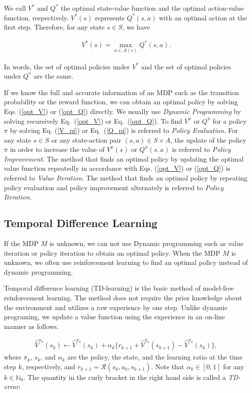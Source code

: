 We call $V^{\ast}$ and $Q^{\ast}$ the optimal state-value function and the optimal action-value function, respectively. $V^{\ast}(s)$ represents $Q^{\ast}(s,a)$ with an optimal action at the first step. Therefore, for any state $s \in S$, we have

\begin{align*}
  V^{\ast}(s) = \max_{a \in \mathcal{A}(s)} Q^{\ast}(s,a).
\end{align*}

In words, the set of optimal policies under $V^{\ast}$ and the set of optimal policies under $Q^{\ast}$ are the same.

If we know the full and accurate information of an MDP such as the transition probability or the reward function, we can obtain an optimal policy by solving Eqs. (\ref{opt_V}) or (\ref{opt_Q}) directly. We usually use {\it Dynamic Programming} by solving recursively Eq.\ (\ref{opt_V}) or Eq.\ (\ref{opt_Q}). To find $V^{\pi}$ or $Q^{\pi}$ for a policy $\pi$ by solving Eq. (\ref{V_pi}) or Eq.\ (\ref{Q_pi}) is referred to {\it Policy Evaluation}. For any state $s \in S$ or any state-action pair $(s,a) \in S \times A$, the update of the policy $\pi$ in order to increase the value of $V^{\pi}(s)$ or $Q^{\pi}(s,a)$ is referred to {\it Policy Improvement}. The method that finds an optimal policy by updating the optimal value function repeatedly in accordance with Eqs. (\ref{opt_V}) or (\ref{opt_Q}) is referred to {\it Value Iteration}. The method that finds an optimal policy by repeating policy evaluation and policy improvement alternately is referred to {\it Policy Iteration}.

\subsection{Temporal Difference Learning}

If the MDP $M$ is unknown, we can not use Dynamic programming such as value iteration or policy iteration to obtain an optimal policy. When the MDP $M$ is unknown, we often use   reinforcement learning to find an optimal policy instead of dynamic programming.

Temporal difference learning (TD-learning) is the basic method of model-free reinforcement learning. The method does not require the prior knowledge about the environment and utilizes a raw experience by one step. Unlike dynamic programing, we update a value function using the experience in an on-line manner as follows.

\begin{align}
  \hat{V}^{\pi_k}(s_k) \leftarrow \hat{V}^{\pi_k}(s_k) + \alpha_k \{ r_{k+1} + \hat{V}^{\pi_k}(s_{k+1}) - \hat{V}^{\pi_k}(s_k) \},
\end{align}
where $\pi_k$, $s_k$, and $\alpha_k$ are the policy, the state, and the learning ratio at the time step $k$, respectively, and $r_{k+1} = \mathcal{R}(s_k, a_k, s_{k+1})$. Note that $\alpha_k \in [0,1]$ for any $k \in \mathbb{N}_0$. The quantity in the curly bracket in the right hand side is called a {\it TD-error}:


